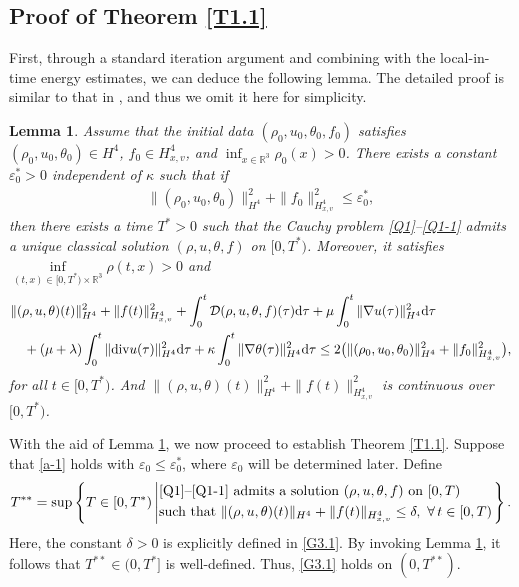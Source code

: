 \documentclass[reqno,11pt]{amsart}
\theoremstyle{plain}
\newtheorem{lem}[thm]{Lemma}
\numberwithin{equation}{section}
\newcommand{\eps}{{\varepsilon}}
\begin{document}
\subsection{Proof of Theorem \ref{T1.1}}
First, through a standard iteration argument and combining with the local-in-time energy estimates, we can deduce the following lemma. The detailed proof  is similar to that  in \cite{LNW-arXiv-2025,Mu-Wang-20}, and thus we omit it here for simplicity.
\begin{lem}\label{L3.6}
Assume that the initial data $(\rho_0,u_0,\theta_0,f_0)$ satisfies $(\rho_0,u_0,\theta_0)\in H^4$, $f_0\in H_{x,v}^4$,
and $\inf _{x\in\mathbb{R}^3}\rho_0(x)>0$.
There exists a constant $\eps_0^*>0$ independent of $\kappa$
such that if
\begin{align*}
\|(\rho _0,u _0,\theta _0)\|_{H^4}^2+\|f_0 \|_{H_{x,v}^4}^2\leq \varepsilon_0^*,
\end{align*}
then there exists a time $T^{*}>0$ such that the Cauchy problem \eqref{Q1}--\eqref{Q1-1} admits a unique classical solution $(\rho,u,\theta,f)$ on $[0,T^{*})$. Moreover, it satisfies $\inf\limits_{(t,x)\in [0,T^*)\times\mathbb{R}^3}\rho(t,x)>0$ and  
\begin{align*} 
&\|(\rho,u,\theta)(t)\|_{H^{4}}^2+\|f(t)\|_{H_{x,v}^4}^2+\int_{0}^{t} \mathcal{D}(\rho,u,\theta,f)(\tau){\rm d}\tau+\mu\int_{0}^{t}\|\nabla u(\tau)\|_{H^4}^2 {\rm d}\tau\nonumber\\ 
&\quad +(\mu+\lambda) \int_{0}^{t}\|{\rm div} u(\tau)\|_{H^4}^2 {\rm d}\tau  +\kappa\int_{0}^{t}\|\nabla\theta(\tau)\|_{H^4}^2 {\rm d}\tau 
\leq  2\big(\|(\rho_{0},u_{0},\theta_{0})\|_{H^{4}}^2+\|f_0\|_{H_{x,v}^4}^2\big), 
\end{align*}  
for all $t\in [0,T^{*})$. And  $\|(\rho,u,\theta)(t)\|_{H^{4}}^2+\|f(t)\|_{H^4_{x,v}}^2$ is continuous over $[0,T^{*})$.
\end{lem}
 
With the aid of Lemma \ref{L3.6}, we now proceed to establish Theorem \ref{T1.1}. Suppose that \eqref{a-1} holds with $\eps_0 \leq \eps_0^*$, where   $\eps_0 $ will be determined later. Define  
\begin{align*}  
T^{**} = \sup  \left\{
  T \in [0,T^{*})\left| \begin{aligned}
 &\text{\eqref{Q1}--\eqref{Q1-1} admits a solution}    \   (\rho,u,\theta,f)     \  \text{on}  \     [0,T)  \    \\  
 &\text{such that}\ \| (\rho,u,\theta)(t)\|_{H^4}+\|f(t)\|_{H^4_{x,v}} \leq \delta,  \     \forall \,     t \in [0,T)
\end{aligned}\right. \right\} .
\end{align*}  
Here, the constant $\delta > 0$ is explicitly defined in \eqref{G3.1}. By invoking Lemma \ref{L3.6}, it follows that $T^{**} \in (0,T^*]$ is well-defined. Thus, \eqref{G3.1} holds on $(0,T^{**})$.
 
\end{document}
